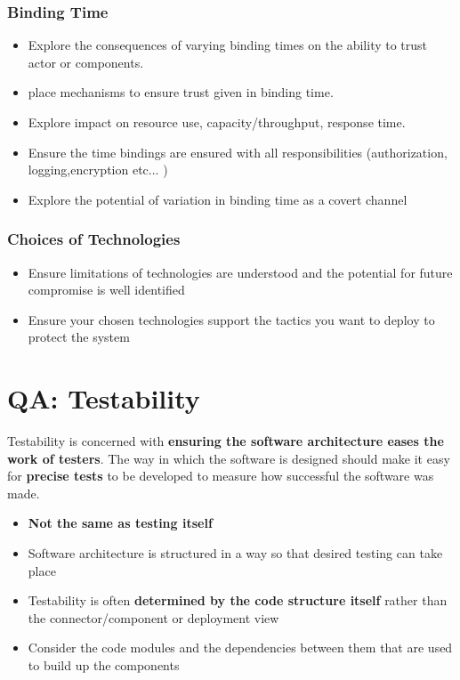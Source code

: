 \documentclass[a4paper]{article}
\begin{document}
\subsubsection{Binding Time}
\begin{itemize}
\item Explore the consequences of varying binding times on the ability to trust actor or components.
\item place mechanisms to ensure trust given in binding time.
\item Explore impact on resource use, capacity/throughput, response time.
\item Ensure the time bindings are ensured with all responsibilities (authorization, logging,encryption etc... )
\item Explore the potential of variation in binding time as a covert channel
\end{itemize}

\subsubsection{Choices of Technologies}
\begin{itemize}
\item  Ensure limitations of technologies are understood and the potential for future compromise is well identified
\item Ensure your chosen technologies support the tactics you want to deploy to protect the system
\end{itemize}

\newpage
\section{QA: Testability}
Testability is concerned with \textbf{ensuring the software architecture eases the work of testers}. The way in which the software is designed should make it easy for \textbf{precise tests} to be developed to measure how successful the software was made.
\begin{itemize}
\item \textbf{Not the same as testing itself}
\item Software architecture is structured in a way so that desired testing can take place
\item Testability is often \textbf{determined by the code structure itself} rather than the connector/component or deployment view
\item Consider the code modules and the dependencies between them that are used to build up the components
\end{itemize}
\end{document}

